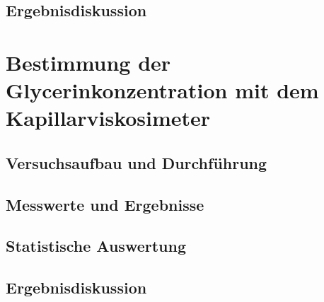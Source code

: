 \documentclass{scrartcl}
\begin{document}
\subsection{Ergebnisdiskussion}






\pagebreak
\section{Bestimmung der Glycerinkonzentration mit dem Kapillarviskosimeter}
\subsection{Versuchsaufbau und Durchführung}
\subsection{Messwerte und Ergebnisse}
\subsection{Statistische Auswertung}
\subsection{Ergebnisdiskussion}
\end{document}

